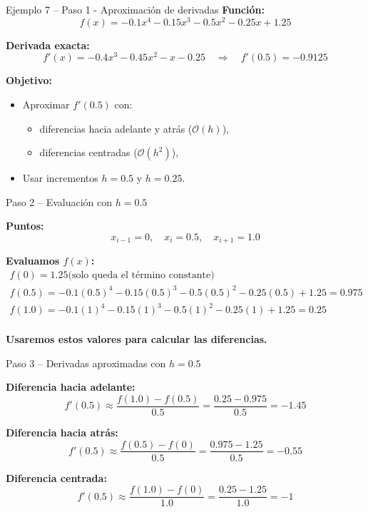 \documentclass[main.tex]{subfiles}
\begin{document}
\begin{frame}{Ejemplo 7 –  Paso 1 - Aproximación de derivadas}
\small
\textbf{Función:}
\[
f(x) = -0.1x^4 - 0.15x^3 - 0.5x^2 - 0.25x + 1.25
\]

\textbf{Derivada exacta:}
\[
f'(x) = -0.4x^3 - 0.45x^2 - x - 0.25
\quad \Rightarrow \quad f'(0.5) = -0.9125
\]

\textbf{Objetivo:}
\begin{itemize}
  \item Aproximar \(f'(0.5)\) con:
  \begin{itemize}
    \item diferencias hacia adelante y atrás (\(\mathcal{O}(h)\)),
    \item diferencias centradas (\(\mathcal{O}(h^2)\)),
  \end{itemize}
  \item Usar incrementos \(h = 0.5\) y \(h = 0.25\).
\end{itemize}
\end{frame}
\begin{frame}{Paso 2 – Evaluación con \(h = 0.5\)}
\small

\textbf{Puntos:}
\[
x_{i-1} = 0, \quad x_i = 0.5, \quad x_{i+1} = 1.0
\]

\textbf{Evaluamos \(f(x)\):}
\[
\begin{array}{ll}
f(0) = 1.25  \text{(solo queda el término constante)} \\
f(0.5) = -0.1(0.5)^4 - 0.15(0.5)^3 - 0.5(0.5)^2 - 0.25(0.5) + 1.25 = 0.975 \\
f(1.0) = -0.1(1)^4 - 0.15(1)^3 - 0.5(1)^2 - 0.25(1) + 1.25 = 0.25 \\
\end{array}
\]

\textbf{Usaremos estos valores para calcular las diferencias.}

\end{frame}
\begin{frame}{Paso 3 – Derivadas aproximadas con \(h = 0.5\)}
\small

\textbf{Diferencia hacia adelante:}
\[
f'(0.5) \approx \frac{f(1.0) - f(0.5)}{0.5}
= \frac{0.25 - 0.975}{0.5} = -1.45
\]

\textbf{Diferencia hacia atrás:}
\[
f'(0.5) \approx \frac{f(0.5) - f(0)}{0.5}
= \frac{0.975 - 1.25}{0.5} = -0.55
\]

\textbf{Diferencia centrada:}
\[
f'(0.5) \approx \frac{f(1.0) - f(0)}{1.0}
= \frac{0.25 - 1.25}{1.0} = -1
\]

\end{frame}
\end{document}
